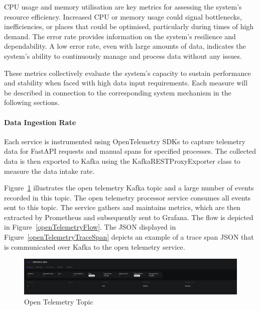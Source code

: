 \documentclass{ieeeaccess}
\begin{document}
CPU usage and memory utilisation are key metrics for assessing the system's resource efficiency. Increased CPU or memory usage could signal bottlenecks, inefficiencies, or places that could be optimised, particularly during times of high demand. The error rate provides information on the system's resilience and dependability. A low error rate, even with large amounts of data, indicates the system's ability to continuously manage and process data without any issues. 

These metrics collectively evaluate the system's capacity to sustain performance and stability when faced with high data input requirements. Each measure will be described in connection to the corresponding system mechanism in the following sections.

\paragraph{Data Ingestion Rate}

Each service is instrumented using OpenTelemetry SDKs to capture telemetry data for FastAPI requests and manual spans for specified processes. The collected data is then exported to Kafka using the KafkaRESTProxyExporter class to measure the data intake rate. 

Figure~\ref{openTelemetryTopic} illustrates the open telemetry Kafka topic and a large number of events recorded in this topic. The open telemetry processor service consumes all events sent to this topic. The service gathers and maintains metrics, which are then extracted by Prometheus and subsequently sent to Grafana. The flow is depicted in Figure~\ref{openTelemetryFlow}. The JSON displayed in Figure~\ref{openTelemetryTraceSpan} depicts an example of a trace span JSON that is communicated over Kafka to the open telemetry service.

\begin{figure}[h]

  \centering

  \includegraphics[width=\textwidth]{images/kafka-open-telemetry-topic-screenshot.png}

  \caption{Open Telemetry Topic}

  \label{openTelemetryTopic}

\end{figure}
\end{document}
